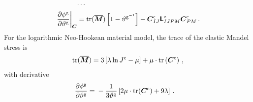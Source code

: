 \documentclass[10pt,letterpaper,oneside]{report}
\newcommand{\ten}[1]{\mbox{\boldmath $#1$}{}}
\newcommand{\tenf}[1]{\mbox{{\sffamily{\bfseries {#1}}}}}
\newcommand{\scas}[1]{\mbox{{\scriptsize{${\rm{#1}}$}}}{}}
\newcommand{\tens}[1]{\mbox{\boldmath{\scriptsize{$#1$}}}{}}
\begin{document}
\begin{itemize}
\begin{align}
\cdots{}& \notag \\
\left. \frac{\partial \phi^{\scas{g}}}{\partial \vartheta^{\scas{g}}} \right|_{\tens{C}}
={}& \mbox{tr} ( \overline{\ten{M}} ) \left[ 1 - \vartheta^{\scas{g}^{-1}} \right]
- \ten{C}^{\scas{e}}_{IJ} \tenf{L}^{\scas{e}}_{IJPM} \ten{C}^{\scas{e}}_{PM} \, . 
\end{align}
For the logarithmic Neo-Hookean material model, the trace of the elastic Mandel stress is 
\begin{equation}
\mbox{tr} (\overline{\ten{M}}) = 3 \left[ \lambda \ln J^{\scas{e}} - \mu \right] + \mu \cdot \mbox{tr} \left( \ten{C}^{\scas{e}} \right) \, , 
\end{equation}
with derivative 
\begin{align}
\frac{\partial \phi^{\scas{g}}}{\partial \vartheta^{\scas{g}}} ={}& - \frac{1}{3 \vartheta^{\scas{g}}} \left[ 2 \mu \cdot \mbox{tr} (\ten{C}^{\scas{e}}) + 9 \lambda \right] \, .
\end{align}


\end{itemize}
\end{document}
